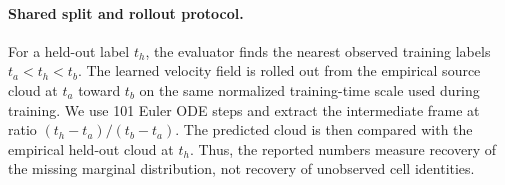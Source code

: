 \paragraph{Shared split and rollout protocol.}
For a held-out label $t_h$, the evaluator finds the nearest observed training labels $t_a<t_h<t_b$. The learned velocity field is rolled out from the empirical source cloud at $t_a$ toward $t_b$ on the same normalized training-time scale used during training. We use 101 Euler ODE steps and extract the intermediate frame at ratio $(t_h-t_a)/(t_b-t_a)$. The predicted cloud is then compared with the empirical held-out cloud at $t_h$. Thus, the reported numbers measure recovery of the missing marginal distribution, not recovery of unobserved cell identities.

\clearpage
\begingroup
\centering
{}
\label{tab:app:datasets}
\small
\setlength{\tabcolsep}{3pt}
